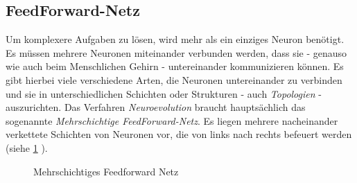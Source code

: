 \documentclass[parskip=half,titlepage]{scrartcl}
\begin{document}
\subsection{FeedForward-Netz}
Um komplexere Aufgaben zu lösen, wird mehr als ein einziges Neuron benötigt. Es müssen mehrere Neuronen miteinander verbunden werden, dass sie - genauso wie auch beim Menschlichen Gehirn - untereinander kommunizieren können. Es gibt hierbei viele verschiedene Arten, die Neuronen untereinander zu verbinden und sie in unterschiedlichen Schichten oder Strukturen - auch \textit{Topologien} - auszurichten. Das Verfahren \textit{Neuroevolution} braucht hauptsächlich das sogenannte \textit{Mehrschichtige FeedForward-Netz}. Es liegen mehrere nacheinander verkettete Schichten von Neuronen vor, die von links nach rechts befeuert werden (siehe \cref{fig:ffnet} ).
\begin{figure}[h]
 \centering
 

\caption{Mehrschichtiges Feedforward Netz}
\label{fig:ffnet}
\end{figure}
\end{document}
